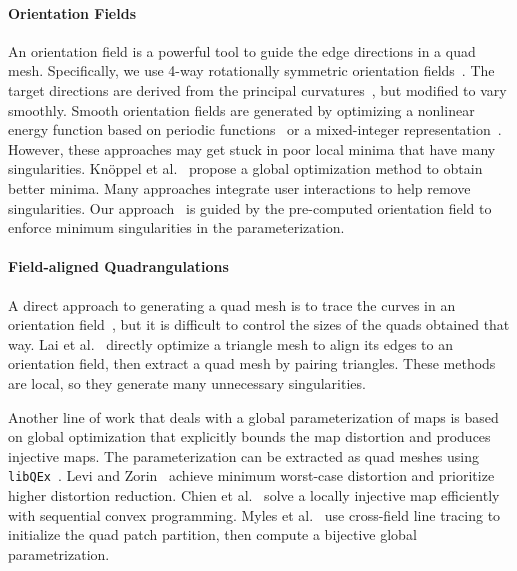 \paragraph*{Orientation Fields}
An orientation field is a powerful tool to guide the edge directions in a quad mesh. Specifically, we use 4-way rotationally symmetric orientation fields~\cite{ray2008n,lai2010metric}. The target directions are derived from the principal curvatures~\cite{cohen2003restricted,cazals2005estimating}, but modified to vary smoothly. Smooth orientation fields are generated by optimizing a nonlinear energy function based on periodic functions~\cite{hertzmann2000illustrating,ray2009geometry} or a mixed-integer representation~\cite{ray2008n,bommes2009mixed}. However, these approaches may get stuck in poor local minima that have many singularities. Kn\"{o}ppel et al.~\cite{knoppel2013globally} propose a global optimization method to obtain better minima. Many approaches \cite{ray2008n,ray2009geometry,crane2010trivial,diamanti2014designing,jiang2015frame} integrate user interactions to help remove singularities. Our approach~\cite{huang2018quadriflow} is guided by the pre-computed orientation field to enforce minimum singularities in the parameterization.

\paragraph*{Field-aligned Quadrangulations}
A direct approach to generating a quad mesh is to trace the curves in an orientation field~\cite{alliez2003anisotropic}, but it is difficult to control the sizes of the quads obtained that way. Lai et al.~\cite{lai2008incremental} directly optimize a triangle mesh to align its edges to an orientation field, then extract a quad mesh by pairing triangles. These methods are local, so they generate many unnecessary singularities.

Another line of work that deals with a global parameterization of maps is based on global optimization that explicitly bounds the map distortion and produces injective maps. The parameterization can be extracted as quad meshes using \texttt{libQEx}~\cite{ebke2013qex}. Levi and Zorin~\cite{levi2014strict} achieve minimum worst-case distortion and prioritize higher distortion reduction. Chien et al.~\cite{chien2016bounded} solve a locally injective map efficiently with sequential convex programming. Myles et al.~\cite{myles2014robust} use cross-field line tracing to initialize the quad patch partition, then compute a bijective global parametrization.

